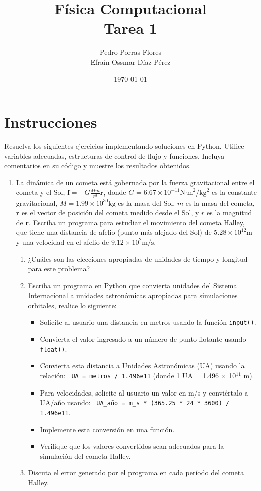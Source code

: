 \documentclass[12pt]{article}
\title{Física Computacional \\ Tarea 1}
\author{Pedro Porras Flores\\ Efraín Ossmar Díaz Pérez}
\date{\today}
\begin{document}
\maketitle

\section*{Instrucciones}
Resuelva los siguientes ejercicios implementando soluciones en Python. Utilice variables adecuadas, estructuras de control de flujo y funciones. Incluya comentarios en su código y muestre los resultados obtenidos.

\begin{enumerate}[label=\textbf{\arabic*.}]

\item La dinámica de un cometa está gobernada por la fuerza gravitacional entre el cometa y el Sol, \(\mathbf{f} = -G \frac{M m}{r^3} \mathbf{r}\), donde \(G = 6.67 \times 10^{-11} \text{N·m}^2/\text{kg}^2\) es la constante gravitacional, \(M = 1.99 \times 10^{30} \text{kg}\) es la masa del Sol, \(m\) es la masa del cometa, \(\mathbf{r}\) es el vector de posición del cometa medido desde el Sol, y \(r\) es la magnitud de \(\mathbf{r}\). Escriba un programa para estudiar el movimiento del cometa Halley, que tiene una distancia de afelio (punto más alejado del Sol) de \(5.28 \times 10^{12} \text{m}\) y una velocidad en el afelio de \(9.12 \times 10^{2} \text{m/s}\). 

\begin{enumerate}[label=\alph*)]
\item ¿Cuáles son las elecciones apropiadas de unidades de tiempo y longitud para este problema?
\item Escriba un programa en Python que convierta unidades del Sistema Internacional a unidades astronómicas apropiadas para simulaciones orbitales, realice lo siguiente:
\begin{itemize}


\item Solicite al usuario una distancia en metros usando la función \texttt{input()}.
\item Convierta el valor ingresado a un número de punto flotante usando \texttt{float()}.
\item Convierta esta distancia a Unidades Astronómicas (UA) usando la relación: \
\texttt{UA = metros / 1.496e11} (donde 1 UA = 1.496 × 10$^{11}$ m).
\item Para velocidades, solicite al usuario un valor en m/s y conviértalo a UA/año usando: \
\texttt{UA\_a\~no = m\_s * (365.25 * 24 * 3600) / 1.496e11}.
\item Implemente esta conversión en una función.
\item Verifique que los valores convertidos sean adecuados para la simulación del cometa Halley.
\end{itemize}
\item  Discuta el error generado por el programa en cada período del cometa Halley.
\end{enumerate}


\end{enumerate}
\end{document}
